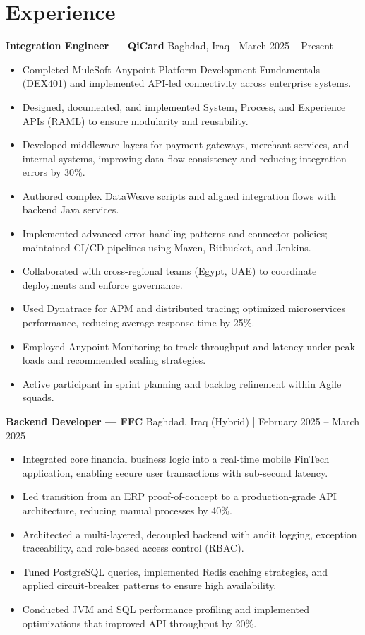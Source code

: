 \documentclass[10pt, a4paper]{article}
\begin{document}
\section*{Experience}

\vspace{1.5mm}
\noindent\textbf{Integration Engineer — QiCard} \hfill Baghdad, Iraq | March 2025 – Present
\begin{itemize}
    \item Completed MuleSoft Anypoint Platform Development Fundamentals (DEX401) and implemented API-led connectivity across enterprise systems.
    \item Designed, documented, and implemented System, Process, and Experience APIs (RAML) to ensure modularity and reusability.
    \item Developed middleware layers for payment gateways, merchant services, and internal systems, improving data-flow consistency and reducing integration errors by 30\%.
    \item Authored complex DataWeave scripts and aligned integration flows with backend Java services.
    \item Implemented advanced error-handling patterns and connector policies; maintained CI/CD pipelines using Maven, Bitbucket, and Jenkins.
    \item Collaborated with cross-regional teams (Egypt, UAE) to coordinate deployments and enforce governance.
    \item Used Dynatrace for APM and distributed tracing; optimized microservices performance, reducing average response time by 25\%.
    \item Employed Anypoint Monitoring to track throughput and latency under peak loads and recommended scaling strategies.
    \item Active participant in sprint planning and backlog refinement within Agile squads.
\end{itemize}

\vspace{1.5mm}
\noindent\textbf{Backend Developer — FFC} \hfill Baghdad, Iraq (Hybrid) | February 2025 – March 2025
\begin{itemize}
    \item Integrated core financial business logic into a real-time mobile FinTech application, enabling secure user transactions with sub-second latency.
    \item Led transition from an ERP proof-of-concept to a production-grade API architecture, reducing manual processes by 40\%.
    \item Architected a multi-layered, decoupled backend with audit logging, exception traceability, and role-based access control (RBAC).
    \item Tuned PostgreSQL queries, implemented Redis caching strategies, and applied circuit-breaker patterns to ensure high availability.
    \item Conducted JVM and SQL performance profiling and implemented optimizations that improved API throughput by 20\%.
\end{itemize}
\end{document}
